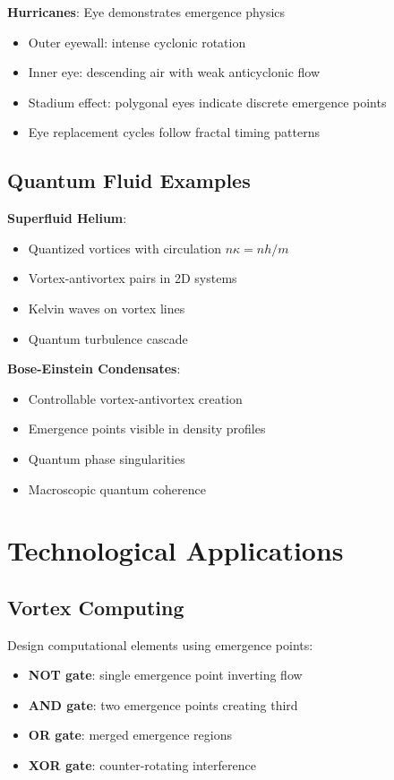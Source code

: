 \textbf{Hurricanes}\cite{emanuel2003}: Eye demonstrates emergence physics
\begin{itemize}
\item Outer eyewall: intense cyclonic rotation
\item Inner eye: descending air with weak anticyclonic flow
\item Stadium effect: polygonal eyes indicate discrete emergence points
\item Eye replacement cycles follow fractal timing patterns
\end{itemize}

\subsection{Quantum Fluid Examples}

\textbf{Superfluid Helium}\cite{donnelly1991}:
\begin{itemize}
\item Quantized vortices with circulation $n\kappa = nh/m$
\item Vortex-antivortex pairs in 2D systems
\item Kelvin waves on vortex lines
\item Quantum turbulence cascade
\end{itemize}

\textbf{Bose-Einstein Condensates}\cite{fetter2009}:
\begin{itemize}
\item Controllable vortex-antivortex creation
\item Emergence points visible in density profiles
\item Quantum phase singularities
\item Macroscopic quantum coherence
\end{itemize}

\section{Technological Applications}

\subsection{Vortex Computing}

Design computational elements using emergence points:
\begin{itemize}
\item \textbf{NOT gate}: single emergence point inverting flow
\item \textbf{AND gate}: two emergence points creating third
\item \textbf{OR gate}: merged emergence regions
\item \textbf{XOR gate}: counter-rotating interference
\end{itemize}

